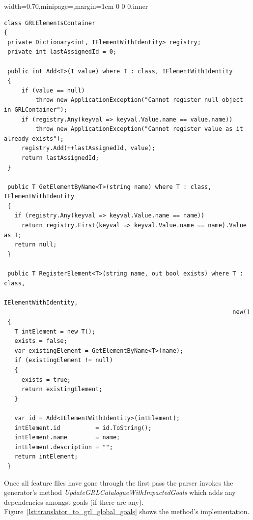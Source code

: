 \documentclass[dissertation,final]{softeng}
\newenvironment{featurecode}[1]
{ \lrbox\featurebox \begin{adjustbox}{width=#1\textwidth,minipage=\textwidth,margin=1cm 0 0 0,inner} }
{ \end{adjustbox}\endlrbox}
\newenvironment{featurelist}[2]
{
\newcommand{\setcaption}{\caption{#1}}
\newcommand{\setlabel}{\label{#2}}
}
{\begin{listing}[h!]\centering\usebox\featurebox\setcaption\setlabel\end{listing}}
\begin{document}
\begin{featurelist}{Translator to GRL -- a Registry object for GRL elements}{lst:translator_to_grl_registry}
\begin{featurecode}{0.70}
\begin{verbatim}
class GRLElementsContainer
{
 private Dictionary<int, IElementWithIdentity> registry;
 private int lastAssignedId = 0;
 
 public int Add<T>(T value) where T : class, IElementWithIdentity
 {
     if (value == null)
         throw new ApplicationException("Cannot register null object in GRLContainer");
     if (registry.Any(keyval => keyval.Value.name == value.name))
         throw new ApplicationException("Cannot register value as it already exists");
     registry.Add(++lastAssignedId, value);
     return lastAssignedId;
 }
 
 public T GetElementByName<T>(string name) where T : class, IElementWithIdentity
 {
   if (registry.Any(keyval => keyval.Value.name == name))
     return registry.First(keyval => keyval.Value.name == name).Value as T;
   return null;
 }
 
 public T RegisterElement<T>(string name, out bool exists) where T : class, 
                                                                 IElementWithIdentity, 
                                                                 new()
 {
   T intElement = new T();
   exists = false;
   var existingElement = GetElementByName<T>(name);
   if (existingElement != null)
   {
     exists = true;
     return existingElement;
   }

   var id = Add<IElementWithIdentity>(intElement);
   intElement.id          = id.ToString();
   intElement.name        = name;
   intElement.description = "";
   return intElement;
 }
\end{verbatim}
\end{featurecode}
\end{featurelist}

Once all feature files have gone through the first pass the parser invokes the generator's method \emph{UpdateGRLCatalogueWithImpactedGoals} which adds any dependencies amongst goals (if there are any). Figure~\ref{lst:translator_to_grl_global_goals} shows the method's implementation. 
\end{document}
